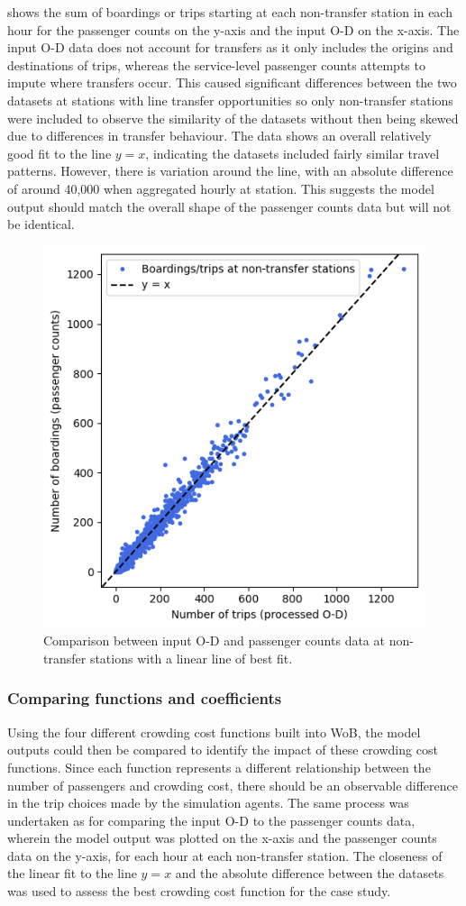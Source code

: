  shows the sum of boardings or trips starting at each non-transfer station in each hour for the passenger counts on the y-axis and the input O-D on the x-axis. The input O-D data does not account for transfers as it only includes the origins and destinations of trips, whereas the service-level passenger counts attempts to impute where transfers occur. This caused significant differences between the two datasets at stations with line transfer opportunities so only non-transfer stations were included to observe the similarity of the datasets without then being skewed due to differences in transfer behaviour. The data shows an overall relatively good fit to the line $y=x$, indicating the datasets included fairly similar travel patterns. However, there is variation around the line, with an absolute difference of around 40,000 when aggregated hourly at station. This suggests the model output should match the overall shape of the passenger counts data but will not be identical.
\begin{figure}
    \centering
    \includegraphics[width=0.5\linewidth]{images/Validation/inputvsdatavic.png}
    \caption[Comparison between input O-D and passenger counts data at non-transfer stations]{Comparison between input O-D and passenger counts data at non-transfer stations with a linear line of best fit.}
    \label{fig:inputvsdatavic}
\end{figure}
\subsubsection{Comparing functions and coefficients }
Using the four different crowding cost functions built into WoB, the model outputs could then be compared to identify the impact of these crowding cost functions. Since each function represents a different relationship between the number of passengers and crowding cost, there should be an observable difference in the trip choices made by the simulation agents. The same process was undertaken as for comparing the input O-D to the passenger counts data, wherein the model output was plotted on the x-axis and the passenger counts data on the y-axis, for each hour at each non-transfer station. The closeness of the linear fit to the line $y=x$ and the absolute difference between the datasets was used to assess the best crowding cost function for the case study. 

